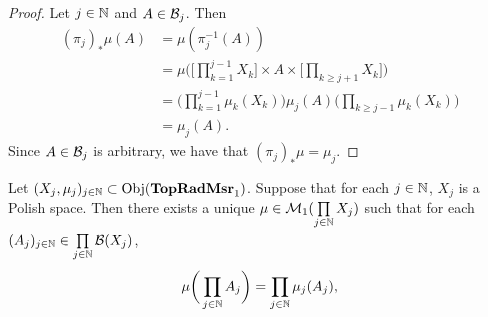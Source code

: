 \documentclass{book}
\begin{document}
\begin{proof}
	Let $j \in \mathbb{N}$ and $A \in \mathcal{B}_j$. Then 
	\begin{align*}
		(\pi_j)_*\mu(A)
		& = \mu(\pi_j^{-1}(A)) \\
		& = \mu \bigg( \bigg[ \prod_{k=1}^{j-1} X_k \bigg] \times A \times \bigg[ \prod_{k \geq j+1} X_k \bigg] \bigg) \\
		& = \bigg( \prod_{k=1}^{j-1} \mu_k(X_k)  \bigg) \mu_j(A) \bigg( \prod_{k \geq j-1} \mu_k(X_k) \bigg) \\
		& = \mu_j(A). 
	\end{align*}
	Since $A \in \mathcal{B}_j$ is arbitrary, we have that $(\pi_j)_*\mu = \mu_j$.
\end{proof}

\begin{ex} 
	Let $(X_j, \mu_j)_{j \in \mathbb{N}} \subset \operatorname{Obj}(\operatorname*{\text{\textbf{TopRadMsr}}_{1}})$. Suppose that for each $j \in \mathbb{N}$, $X_j$ is a Polish space.
	Then there exists a unique $\mu \in \mathcal{M}_1(\prod\limits_{j \in \mathbb{N}} X_j)$ such that for each $(A_j)_{j \in \mathbb{N}} \in \prod\limits_{j \in \mathbb{N}} \mathcal{B}(X_j)$, 
	$$\mu \bigg(\prod_{j \in \mathbb{N}} A_j \bigg) = \prod_{j \in \mathbb{N}} \mu_j(A_j),$$
\end{ex}
\end{document}
